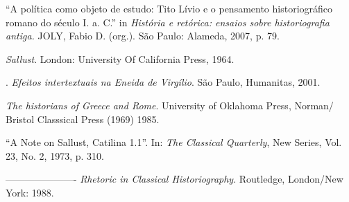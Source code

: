 \begin{bibliohedra}
 “A política como objeto de estudo: Tito Lívio e o pensamento historiográfico romano do século I. a. C.”  in \emph{História e retórica: ensaios sobre historiografia antiga.} JOLY, Fabio D. (org.). São Paulo: Alameda, 2007, p. 79. 
 
  \emph{Sallust}. London: University Of California Press, 1964.

 

. \emph{Efeitos intertextuais na Eneida de Virgílio}. São Paulo, Humanitas, 2001.



 \emph{The historians of Greece and Rome}. University of Oklahoma Press, Norman/ Bristol Classsical Press (1969) 1985.


 “A Note on Sallust, Catilina 1.1”. In: \emph{The Classical Quarterly}, New Series, Vol. 23, No. 2, 1973, p. 310.

---------------------- \emph{Rhetoric in Classical Historiography}. Routledge, London/New York: 1988.


\end{bibliohedra}

 






 
